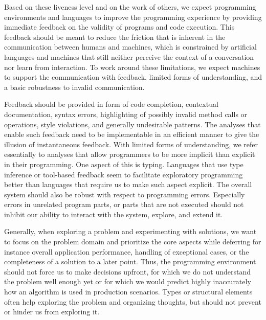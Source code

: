\documentclass[sigconf, authorversion]{acmart}
\begin{document}
Based on these liveness level and on the work of others\citep{McDirmid:2007:LUL,Burckhardt:2013:ACF,Rein:2016:LLP},
we expect programming environments and languages
to improve the programming experience by providing immediate feedback on
the validity of programs and code execution.
This feedback should be meant to reduce the friction
that is inherent in the communication between humans and machines,
which is constrained by artificial languages and machines
that still neither perceive the context of a conversation nor learn from interaction.
To work around these limitations,
we expect machines to support the communication with feedback,
limited forms of understanding,
and a basic robustness to invalid communication.

Feedback should be provided in form of
code completion, contextual documentation,
syntax errors, highlighting of possibly invalid method calls or operations,
style violations, and generally undesirable patterns.
The analyses that enable such feedback need to be implementable
in an efficient manner to give the illusion of instantaneous feedback.
%
With limited forms of understanding,
we refer essentially to analyses
that allow programmers to be more implicit than explicit in their programming.
One aspect of this is typing.
Languages that use type inference
or tool-based feedback seem to facilitate exploratory programming better
than languages that require us to make such aspect explicit.
%   
The overall system should also be robust with respect to programming errors.
Especially errors in unrelated program parts,
or parts that are not executed
should not inhibit our ability to interact with the system,
explore, and extend it.

Generally, when exploring a problem and experimenting with solutions,
we want to focus on the problem domain and prioritize the core aspects
while deferring for instance overall application performance,
handling of exceptional cases,
or the completeness of a solution to a later point.
Thus, the programming environment should not force us to make decisions upfront,
for which we do not understand the problem well enough yet
or for which we would predict highly inaccurately
how an algorithm is used in production scenarios.
Types or structural elements often help exploring
the problem and organizing thoughts,
but should not prevent or hinder us from exploring it.
\end{document}
